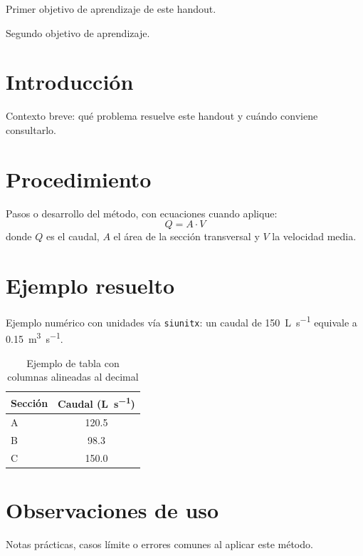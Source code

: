 \documentclass[11pt]{scrartcl}
\begin{document}
\icvmaketitle

\begin{icvobjectives}
  \item Primer objetivo de aprendizaje de este handout.
  \item Segundo objetivo de aprendizaje.
\end{icvobjectives}

\section{Introducción}

Contexto breve: qué problema resuelve este handout y cuándo conviene
consultarlo.

\section{Procedimiento}

Pasos o desarrollo del método, con ecuaciones cuando aplique:
\[
  Q = A \cdot V
\]
donde \(Q\) es el caudal, \(A\) el área de la sección transversal y \(V\)
la velocidad media.

\section{Ejemplo resuelto}

Ejemplo numérico con unidades vía \texttt{siunitx}: un caudal de
\qty{150}{\liter\per\second} equivale a \qty{0.15}{\cubic\meter\per\second}.

\begin{table}[htbp]
  \centering
  \caption{Ejemplo de tabla con columnas alineadas al decimal}
  \begin{tabular}{l S[table-format=3.1]}
    \toprule
    {Sección} & {Caudal (\unit{\liter\per\second})} \\
    \midrule
    A & 120.5 \\
    B & 98.3  \\
    C & 150.0 \\
    \bottomrule
  \end{tabular}
\end{table}

\section{Observaciones de uso}

Notas prácticas, casos límite o errores comunes al aplicar este método.
\end{document}
